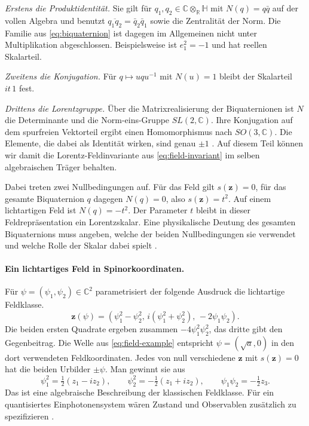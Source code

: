 \emph{Erstens die Produktidentität.} Sie gilt für \(q_1,q_2\in\mathbb C\otimes_{\mathbb R}\mathbb H\) mit \(N(q)=q\bar q\) auf der vollen Algebra und benutzt \(\overline{q_1q_2}=\bar q_2\bar q_1\) sowie die Zentralität der Norm. Die Familie aus \eqref{eq:biquaternion} ist dagegen im Allgemeinen nicht unter Multiplikation abgeschlossen. Beispielsweise ist \(e_1^2=-1\) und hat reellen Skalarteil.

\emph{Zweitens die Konjugation.} Für \(q\mapsto uqu^{-1}\) mit \(N(u)=1\) bleibt der Skalarteil \(it\,1\) fest.

\emph{Drittens die Lorentzgruppe.} Über die Matrixrealisierung der Biquaternionen ist \(N\) die Determinante und die Norm-eins-Gruppe \(SL(2,\mathbb C)\). Ihre Konjugation auf dem spurfreien Vektorteil ergibt einen Homomorphismus nach \(SO(3,\mathbb C)\). Die Elemente, die dabei als Identität wirken, sind genau \(\pm1\) \cite{feldkern}. Auf diesem Teil können wir damit die Lorentz-Feldinvariante aus \eqref{eq:field-invariant} im selben algebraischen Träger behalten.

Dabei treten zwei Nullbedingungen auf. Für das Feld gilt \(s(\mathbf z)=0\), für das gesamte Biquaternion \(q\) dagegen \(N(q)=0\), also \(s(\mathbf z)=t^2\). Auf einem lichtartigen Feld ist \(N(q)=-t^2\). Der Parameter \(t\) bleibt in dieser Feldrepräsentation ein Lorentzskalar. Eine physikalische Deutung des gesamten Biquaternions muss angeben, welche der beiden Nullbedingungen sie verwendet und welche Rolle der Skalar dabei spielt \cite{feldkern,grundidee}.

\paragraph{Ein lichtartiges Feld in Spinorkoordinaten.}
Für \(\psi=(\psi_1,\psi_2)\in\mathbb C^2\) parametrisiert der folgende Ausdruck die lichtartige Feldklasse.
\begin{equation}
 \mathbf z(\psi)=
 (\psi_1^2-\psi_2^2,\,i(\psi_1^2+\psi_2^2),\,-2\psi_1\psi_2).
 \label{eq:field-null-spinor}
\end{equation}
Die beiden ersten Quadrate ergeben zusammen \(-4\psi_1^2\psi_2^2\), das dritte gibt den Gegenbeitrag. Die Welle aus \eqref{eq:field-example} entspricht \(\psi=(\sqrt a,0)\) in den dort verwendeten Feldkoordinaten. Jedes von null verschiedene \(\mathbf z\) mit \(s(\mathbf z)=0\) hat die beiden Urbilder \(\pm\psi\). Man gewinnt sie aus
\[
 \psi_1^2=\tfrac12(z_1-iz_2),\qquad
 \psi_2^2=-\tfrac12(z_1+iz_2),\qquad
 \psi_1\psi_2=-\tfrac12 z_3 .
\]
Das ist eine algebraische Beschreibung der klassischen Feldklasse. Für ein quantisiertes Einphotonensystem wären Zustand und Observablen zusätzlich zu spezifizieren \cite{feldkern}.

